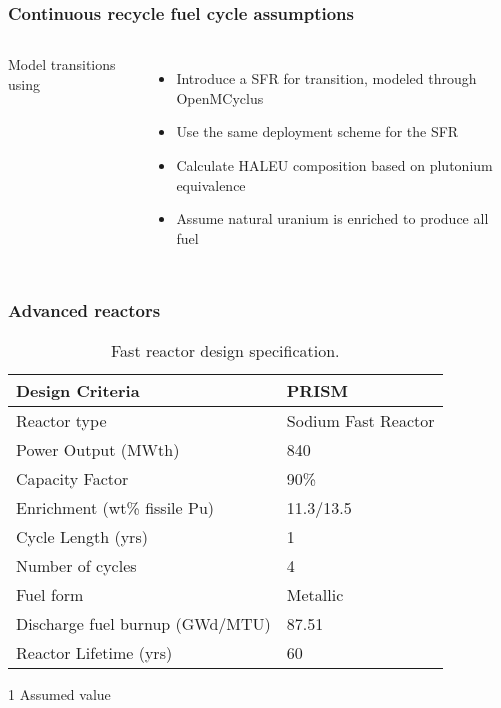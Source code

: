 \begin{frame}
    \frametitle{Continuous recycle fuel cycle assumptions}
    \begin{columns}
        
    \column[t]{6cm}
    \vspace{-0.9cm}
    

        \column[t]{4.5cm}
        Model transitions using \Cyclus \cite{huff_fundamental_2016}
        \begin{itemize}
            \item Introduce a \gls{SFR} for transition, modeled through 
                  OpenMCyclus
            \item<2-> Use the same deployment scheme for the \gls{SFR}
            \item<2-> Calculate HALEU composition based on plutonium
                      equivalence
            \item<3-> Assume natural uranium is enriched to produce all 
                  fuel
        \end{itemize}

\end{columns}
\end{frame}

\begin{frame}
    \frametitle{Advanced reactors}
    \vspace{-0.2cm}
    \begingroup
        \renewcommand{\arraystretch}{1.5}
        \begin{table}
            \centering
            \begin{threeparttable}
        
            \caption{Fast reactor design specification.}
            \label{tab:fast_rx}
            \begin{tabular}{l l}
                \hline
                Design Criteria & PRISM \cite{triplett_prism:_2012,fichtlscherer_assessing_2019}\\
                \hline
                Reactor type & Sodium Fast Reactor\\
                Power Output (MWth) & 840 \\
                Capacity Factor & 90\%\tnote{1} \\
                Enrichment (wt\% fissile Pu) &  11.3/13.5\\
                Cycle Length (yrs) & 1 \\
                Number of cycles &  4\\
                Fuel form &  Metallic \\
                Discharge fuel burnup (GWd/MTU) & 87.51 \\
                Reactor Lifetime (yrs)&  60\\
                \hline
            \end{tabular}
            \begin{tablenotes}
                \item [1] Assumed value
            \end{tablenotes}
        \end{threeparttable}
        \end{table} 
    \endgroup
\end{frame}
